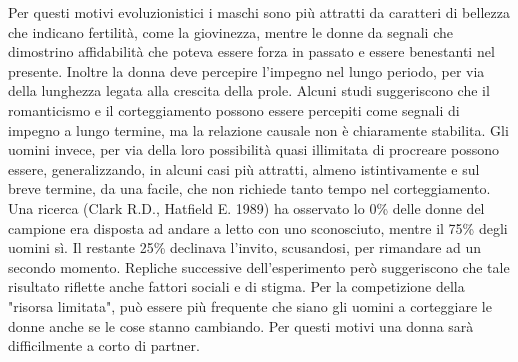 \documentclass[12pt]{book} %
\begin{document}
Per questi motivi evoluzionistici i maschi sono più attratti da caratteri di bellezza che indicano fertilità, come la giovinezza, mentre le donne da segnali che dimostrino affidabilità che poteva essere forza in passato e essere benestanti nel presente.
Inoltre la donna deve percepire l'impegno nel lungo periodo, per via della lunghezza legata alla crescita della prole. Alcuni studi suggeriscono che il romanticismo e il corteggiamento possono essere percepiti come segnali di impegno a lungo termine, ma la relazione causale non è chiaramente stabilita. Gli uomini invece, per via della loro possibilità quasi illimitata di procreare possono essere, generalizzando, in alcuni casi più attratti, almeno istintivamente e sul breve termine, da una facile, che non richiede tanto tempo nel corteggiamento. Una ricerca (Clark R.D., Hatfield E. 1989) ha osservato lo 0\% delle donne del campione era disposta ad andare a letto con uno sconosciuto, mentre il 75\% degli uomini sì. Il restante 25\% declinava l'invito, scusandosi, per rimandare ad un secondo momento. Repliche successive dell'esperimento però suggeriscono che tale risultato riflette anche fattori sociali e di stigma. Per la competizione della "risorsa limitata", può essere più frequente che siano gli uomini a corteggiare le donne anche se le cose stanno cambiando. Per questi motivi una donna sarà difficilmente a corto di partner. 
\end{document}
